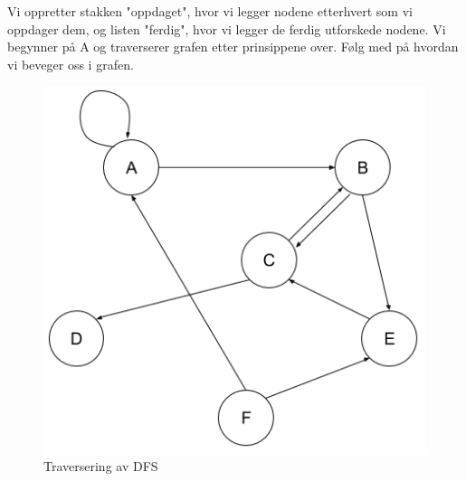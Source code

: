 \begin{boxed}
Vi oppretter stakken "oppdaget", hvor vi legger nodene etterhvert som vi oppdager dem, og listen "ferdig", hvor vi legger de ferdig utforskede nodene.\newline\newline
Vi begynner på A og traverserer grafen etter prinsippene over. Følg med på hvordan vi beveger oss i grafen.

\begin{figure}[H]
\includegraphics[scale=0.5]{images/DFS}
\centering %
\caption{Traversering av DFS}
\label{fig:DFS}
\end{figure}


\end{boxed}
